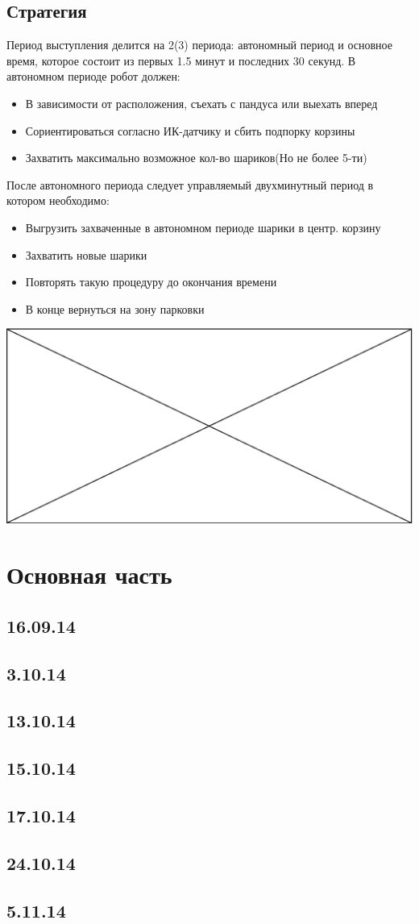 \documentclass[11pt]{article}
\newcommand\measurepage{\dimexpr\pagegoal-\pagetotal-\baselineskip\relax}
\newcommand\fillpage{\includegraphics[width=\textwidth, height=\measurepage]{img/fill_page.eps}}
\begin{document}
		\subsection{Стратегия}
			Период выступления делится на 2(3) периода: автономный период и основное время, которое состоит из первых 1.5 минут и последних 30 секунд.
			В автономном периоде робот должен:
			\begin{itemize}
				\item В зависимости от расположения, съехать с пандуса или выехать вперед
				\item Сориентироваться согласно ИК-датчику и сбить подпорку корзины
				\item Захватить максимально возможное кол-во шариков(Но не более 5-ти)
			\end{itemize}
			После автономного периода следует управляемый двухминутный период в котором необходимо:
			\begin{itemize}
				\item Выгрузить захваченные в автономном периоде шарики в центр. корзину
				\item Захватить новые шарики 
				\item Повторять такую процедуру до окончания времени
				\item В конце вернуться на зону парковки
			\end{itemize}
			\fillpage
		
	\section{Основная часть}
	
	\subsection{16.09.14}
	
	
	\subsection{3.10.14}
	
	
	\subsection{13.10.14}
	
	
	\subsection{15.10.14}
	
	
	\subsection{17.10.14}
	

	\subsection{24.10.14}
		
	
	\subsection{5.11.14}
		
\end{document}
